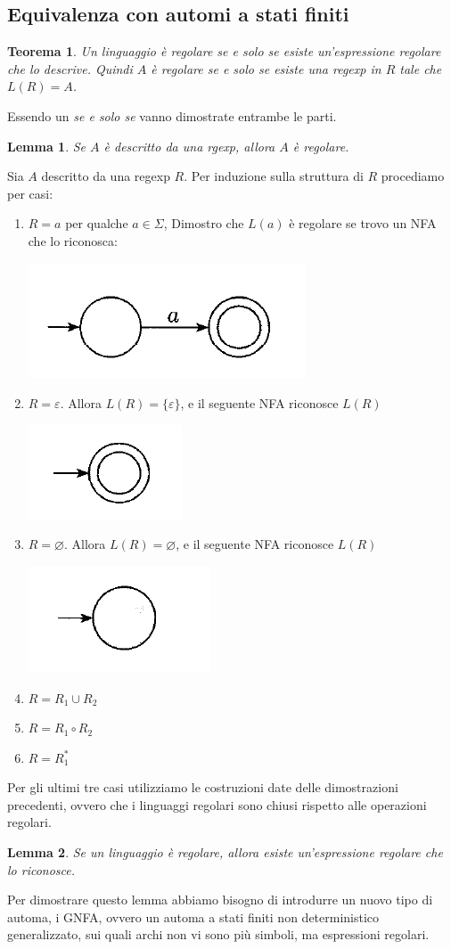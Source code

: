 \documentclass[italian]{article}
\newtheorem*{theorem*}{Teorema}
\newtheorem*{lemma*}{Lemma}
\begin{document}
\subsection{Equivalenza con automi a stati finiti}
\begin{theorem*}
Un linguaggio è regolare se e solo se esiste un'espressione regolare che lo descrive. Quindi $A$ è regolare se e solo se esiste una \textit{regexp} in $R$ tale che $L(R) = A$.
\end{theorem*}
\noindent
Essendo un \textit{se e solo se} vanno dimostrate entrambe le parti.
\begin{lemma*}
	Se $A$ è descritto da una rgexp, allora $A$ è regolare.
\end{lemma*}
\noindent Sia $A$ descritto da una regexp $R$. Per induzione sulla struttura di $R$ procediamo per casi:
\begin{enumerate}[label=\arabic*)]
	\item $R = a$ per qualche $a \in \Sigma$, Dimostro che $L(a)$ è regolare se trovo un NFA che lo riconosca:
	\begin{center}
		\includegraphics[width=0.3\linewidth]{images/regexp_dim_1}
	\end{center}
	\item $R = \varepsilon$. Allora $L(R) = \{ \varepsilon \}$, e il seguente NFA riconosce $L(R)$
	\begin{center}
		\includegraphics[width=0.2\linewidth]{images/regexp_dim_2}
	\end{center}
	\item $R = \varnothing$. Allora $L(R) = \varnothing$, e il seguente NFA riconosce $L(R)$
	\begin{center}
		\includegraphics[width=0.2\linewidth]{images/regexp_dim_3}
	\end{center}
	\item $R = R_1 \cup R_2$
	\item $R = R_1 \circ R_2$
	\item $R = R_1^*$
\end{enumerate}
Per gli ultimi tre casi utilizziamo le costruzioni date delle dimostrazioni precedenti, ovvero che i linguaggi regolari sono chiusi rispetto alle operazioni regolari.
\begin{lemma*}
	Se un linguaggio è regolare, allora esiste un'espressione regolare che lo riconosce.
\end{lemma*}
\noindent
Per dimostrare questo lemma abbiamo bisogno di introdurre un nuovo tipo di automa, i GNFA, ovvero un automa a stati finiti non deterministico generalizzato, sui quali archi non vi sono più simboli, ma espressioni regolari.
\pagebreak
\end{document}
